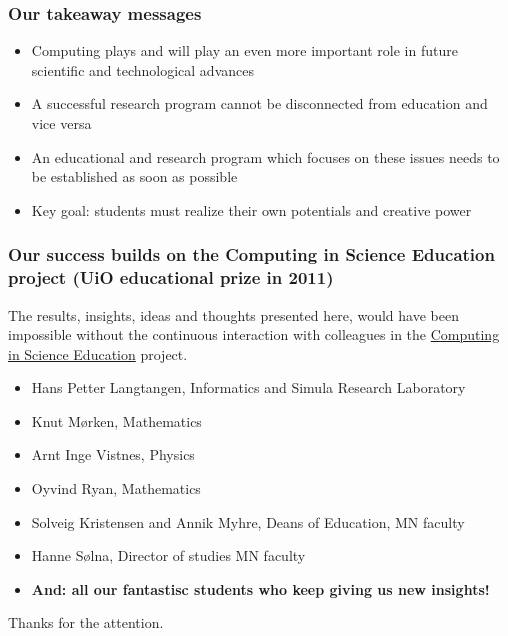 \documentclass{beamer}
\begin{document}
\begin{frame}
\frametitle{Our takeaway messages}

\begin{block}{}
\begin{itemize}
\item Computing plays and will play an even more important role in future scientific and technological advances

\item A successful research program cannot be disconnected from education and vice versa

\item An educational and research program which focuses on these issues needs to be established as soon as possible

\item Key goal: students must realize their own potentials and creative power
\end{itemize}

\noindent
\end{block}
\end{frame}

\begin{frame}
\frametitle{Our success builds on the Computing in Science Education project (UiO educational prize in 2011)}

\begin{block}{}
The results, insights, ideas and thoughts presented here, would have been impossible without the continuous interaction with colleagues in the \href{{http://www.mn.uio.no/english/about/collaboration/cse/}}{Computing in Science Education} project.

\begin{itemize}
\item Hans Petter Langtangen, Informatics and Simula Research Laboratory

\item Knut Mørken, Mathematics

\item Arnt Inge Vistnes, Physics

\item Oyvind Ryan, Mathematics

\item Solveig Kristensen and Annik Myhre, Deans of Education, MN faculty

\item Hanne Sølna, Director of studies MN faculty

\item \textbf{And: all our fantastisc students who keep giving us new insights!}
\end{itemize}

\noindent
\end{block}
Thanks for the attention.
\end{frame}
\end{document}

